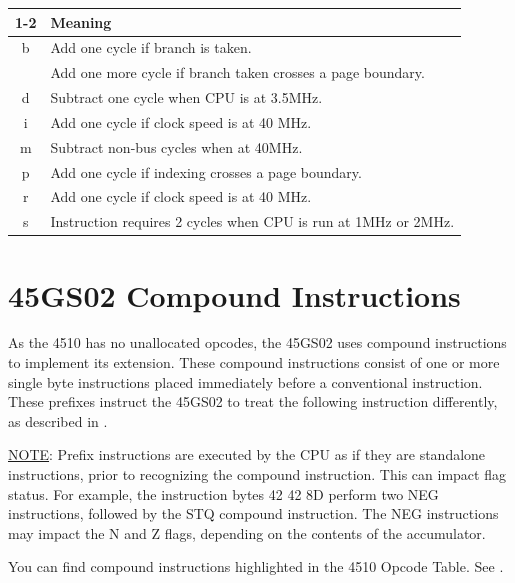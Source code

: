 \begin{center}
  \begin{tabular}{|p{2em}|l|}
  \cline{1-2}
    & {\bf Meaning} \\\hline
\multicolumn{1}{|c|}{b} & Add one cycle if branch is taken. \\
    & Add one more cycle if branch taken crosses a page boundary. \\\hline
\multicolumn{1}{|c|}{d} & Subtract one cycle when CPU is at 3.5MHz.  \\\hline
\multicolumn{1}{|c|}{i} & Add one cycle if clock speed is at 40 MHz. \\\hline
\multicolumn{1}{|c|}{m} & Subtract non-bus cycles when at 40MHz.  \\\hline
\multicolumn{1}{|c|}{p} & Add one cycle if indexing crosses a page boundary. \\\hline
\multicolumn{1}{|c|}{r} & Add one cycle if clock speed is at 40 MHz. \\\hline
\multicolumn{1}{|c|}{s} & Instruction requires 2 cycles when CPU is run at 1MHz or 2MHz. \\\hline
  \end{tabular}
\end{center}





\section{45GS02 Compound Instructions}

As the 4510 has no unallocated opcodes, the 45GS02 uses compound instructions
to implement its extension.  These compound instructions consist of one or
more single byte instructions placed immediately before a conventional
instruction.  These prefixes instruct the 45GS02 to treat the following instruction
differently, as described in .

\underline{NOTE}: Prefix instructions are executed by the CPU as if they are standalone instructions, prior to recognizing the compound instruction. This can impact flag status. For example, the instruction bytes 42 42 8D perform two NEG instructions, followed by the STQ compound instruction. The NEG instructions may impact the N and Z flags, depending on the contents of the accumulator.

You can find compound instructions highlighted in the 4510 Opcode Table. See .






\endgroup
